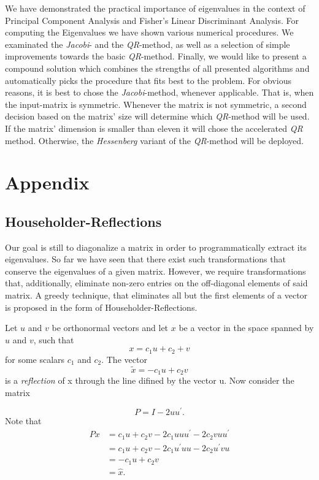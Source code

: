 \documentclass[12pt]{article}
\begin{document}
We have demonstrated the practical importance of eigenvalues in the context of Principal Component Analysis and Fisher's Linear Discriminant Analysis. For computing the Eigenvalues we have shown various numerical procedures. We examinated the \textit{Jacobi}- and the \textit{QR}-method, as well as a selection of simple improvements towards the basic \textit{QR}-method. Finally, we would like to present a compound solution which combines the strengths of all presented algorithms and automatically picks the procedure that fits best to the problem. For obvious reasons, it is best to chose the \textit{Jacobi}-method, whenever applicable. That is, when the input-matrix is symmetric. Whenever the matrix is not symmetric, a second decision based on the matrix' size will determine which \textit{QR}-method will be used. If the matrix' dimension is smaller than eleven it will chose the accelerated \textit{QR} method. Otherwise, the \textit{Hessenberg} variant of the \textit{QR}-method will be deployed. 

\newpage
\section{Appendix}
\subsection{Householder-Reflections}

Our goal is still to diagonalize a matrix in order to programmatically extract its eigenvalues. So far we have seen that there exist such transformations that conserve the eigenvalues of a given matrix. However, we require transformations that, additionally, eliminate non-zero entries on the off-diagonal elements of said matrix. A greedy technique, that eliminates all but the first elements of a vector is proposed in the form of Householder-Reflections.

Let $u$ and $v$ be orthonormal vectors and let $x$ be a vector in the space spanned by $u$ and $v$, such that
$$x = c_1 u + c_2 + v$$ 
for some scalars $c_1$ and $c_2$. The vector 
$$\tilde{x}=-c_1 u + c_2 v$$ 
is a \textit{reflection} of x through the line difined by the vector u. Now consider the matrix

\begin{equation}
P = I - 2 uu^{\prime}.
\end{equation}
Note that
\begin{align*}
Px &= c_1 u + c_2 v - 2c_1 uuu^{\prime} - 2 c_2 v uu^{\prime} \\
   &= c_1 u + c_2 v - 2c_1 u^{\prime}uu - 2 c_2 u^{\prime} v u \\
   &= -c_1 u + c_2 v\\
   &= \hat{x}.
\end{align*}
\end{document}
